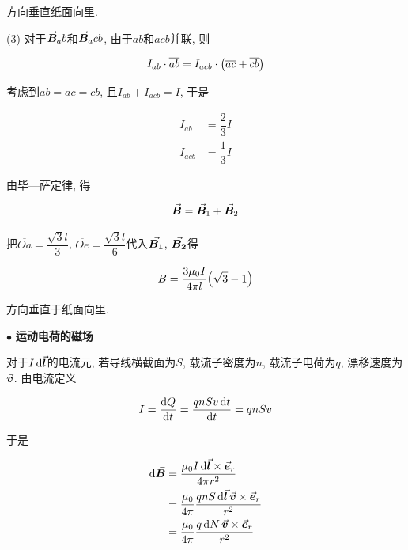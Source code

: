 \begin{example}
\begin{solution}
		方向垂直纸面向里. 
		
		(3) 对于$\va*{B}_ab$和$\va*{B}_acb$, 由于$ab$和$acb$并联, 则
		
		\begin{equation*}
			I_{ab} \cdot \overline{ab} = I_{acb} \cdot \qty(\overline{ac} + \overline{cb})
		\end{equation*}
		
		考虑到$ab = ac = cb$, 且$I_{ab} + I_{acb} = I$, 于是
		
		\begin{align*}
			I_{ab} &= \dfrac{2}{3} I \\
			I_{acb} &= \dfrac{1}{3} I
		\end{align*}
		
		由毕—萨定律, 得
		
		\begin{equation*}
			\va*{B} = \va*{B}_1 + \va*{B}_2
		\end{equation*}
		
		把$\overline{Oa} = \dfrac{\sqrt{3} l}{3}$, $\overline{Oe} = \dfrac{\sqrt{3} l}{6}$代入$\va*{B_1}$, $\va*{B_2}$得
		
		\begin{equation*}
			B = \dfrac{3 \mu_0 I}{4 \pi l} \qty(\sqrt{3} - 1)
		\end{equation*}
	
	    方向垂直于纸面向里. 
	
	\end{solution}
	
\end{example}

$\bullet$ \textbf{运动电荷的磁场}

对于$I\dd{\va*{l}}$的电流元, 若导线横截面为$S$, 载流子密度为$n$, 载流子电荷为$q$, 漂移速度为$\va*{v}$. 由电流定义

\begin{equation}
	I = \dv{Q}{t} = \dfrac{qnSv\dd{t}}{\dd{t}} = qnSv \label{C8-eq13}
\end{equation}

于是

\begin{align*}
	\dd{\va*{B}} &= \dfrac{\mu_0 I \dd{\va*{l}} \times \va*{e}_r}{4 \pi r^2} \\
	&= \dfrac{\mu_0}{4 \pi} \dfrac{qnS\dd{\va*{l}} \va*{v} \times \va*{e}_r}{r^2} \\
	&= \dfrac{\mu_0}{4 \pi} \dfrac{q\dd{N} \va*{v} \times \va*{e}_r}{r^2}
\end{align*}

